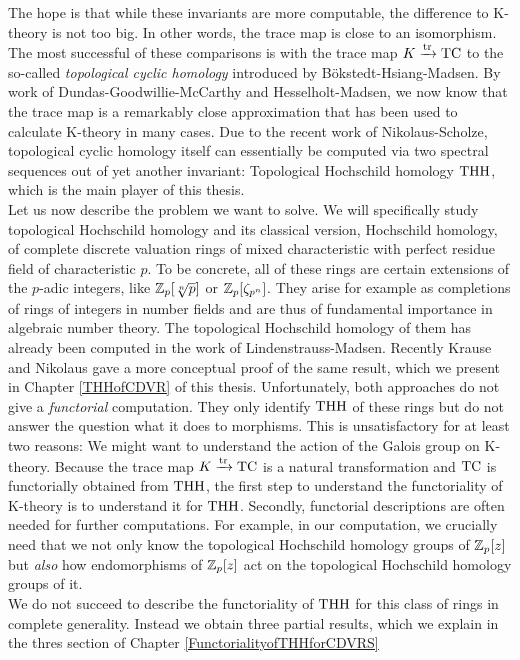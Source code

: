The hope is that while these invariants are more computable, the difference to K-theory is not too big. In other words, the trace map is close to an isomorphism. 
The most successful of these comparisons is with the trace map $K\xrightarrow{\operatorname{tr}} \operatorname{TC}$ to the so-called \textit{topological cyclic homology} introduced by Bökstedt-Hsiang-Madsen.
By work of Dundas-Goodwillie-McCarthy and Hesselholt-Madsen, we now know that the trace map is a remarkably close approximation that has been used to calculate K-theory in many cases.
Due to the recent work of Nikolaus-Scholze, topological cyclic homology itself can essentially be computed via two spectral sequences out of yet another invariant: Topological Hochschild homology $\operatorname{THH}$, which is the main player of this thesis. \\
Let us now describe the problem we want to solve.
We will specifically study topological Hochschild homology and its classical version, Hochschild homology, of complete discrete valuation rings of mixed characteristic with perfect residue field of characteristic $p$. 
To be concrete, all of these rings are certain extensions of the $p$-adic integers, like $\mathbb{Z}_p[\sqrt[n]{p}]$ or $\mathbb{Z}_p[\zeta_{p^n}]$. They arise for example as completions of rings of integers in number fields and are thus of fundamental importance in algebraic number theory.
The topological Hochschild homology of them has already been computed in the work of Lindenstrauss-Madsen. 
Recently Krause and Nikolaus gave a more conceptual proof of the same result, which we present in Chapter \ref{THHofCDVR} of this thesis. 
Unfortunately, both approaches do not give a \textit{functorial} computation. They only identify $\operatorname{THH}$ of these rings but do not answer the question what it does to morphisms. 
This is unsatisfactory for at least two reasons: We might want to understand the action of the Galois group on K-theory. Because the trace map $K\xrightarrow{\operatorname{tr}}\operatorname{TC}$ is a natural transformation and $\operatorname{TC}$ is functorially obtained from $\operatorname{THH}$, the first step to understand the functoriality of K-theory is to understand it for $\operatorname{THH}$.
Secondly, functorial descriptions are often needed for further computations. For example, in our computation, we crucially need that we not only know the topological Hochschild homology groups of $\mathbb{Z}_p[z]$ but \textit{also} how endomorphisms of $\mathbb{Z}_p[z]$ act on the topological Hochschild homology groups of it. \\
We do not succeed to describe the functoriality of $\operatorname{THH}$ for this class of rings in complete generality. Instead we obtain three partial results, which we explain in the thres section of Chapter \ref{FunctorialityofTHHforCDVRS}\\
